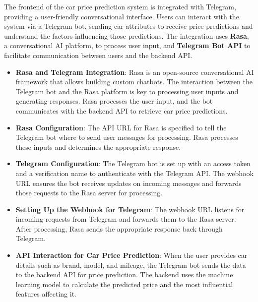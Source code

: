 \documentclass[a4paper,12pt]{article}
\begin{document}
\begin{justify}
	The frontend of the car price prediction system is integrated with Telegram, providing a user-friendly conversational interface. Users can interact with the system via a Telegram bot, sending car attributes to receive price predictions and understand the factors influencing those predictions. The integration uses \textbf{Rasa}, a conversational AI platform, to process user input, and \textbf{Telegram Bot API} to facilitate communication between users and the backend API.
	
	\begin{itemize}
		\item \textbf{Rasa and Telegram Integration}: Rasa is an open-source conversational AI framework that allows building custom chatbots. The interaction between the Telegram bot and the Rasa platform is key to processing user inputs and generating responses. Rasa processes the user input, and the bot communicates with the backend API to retrieve car price predictions.
		
		\item \textbf{Rasa Configuration}: The API URL for Rasa is specified to tell the Telegram bot where to send user messages for processing. Rasa processes these inputs and determines the appropriate response.
		
		\item \textbf{Telegram Configuration}: The Telegram bot is set up with an access token and a verification name to authenticate with the Telegram API. The webhook URL ensures the bot receives updates on incoming messages and forwards those requests to the Rasa server for processing.
		
		\item \textbf{Setting Up the Webhook for Telegram}: The webhook URL listens for incoming requests from Telegram and forwards them to the Rasa server. After processing, Rasa sends the appropriate response back through Telegram.
		
		\item \textbf{API Interaction for Car Price Prediction}: When the user provides car details such as brand, model, and mileage, the Telegram bot sends the data to the backend API for price prediction. The backend uses the machine learning model to calculate the predicted price and the most influential features affecting it.
		

\end{itemize}
\end{justify}
\end{document}
